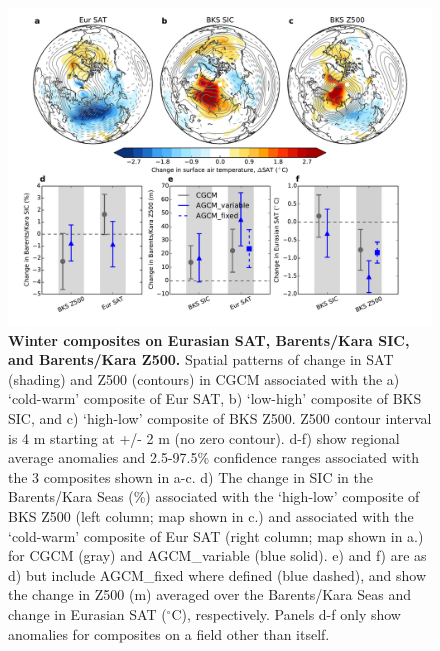 \documentclass{nature}
\begin{document}
\begin{figure}%
\centering
\noindent\includegraphics[width=39pc]{Word/Figure_5.pdf}
\caption{\textbf{Winter composites on Eurasian SAT, Barents/Kara SIC, and Barents/Kara Z500.} Spatial patterns of change in SAT (shading) and Z500 (contours) in CGCM associated with the a) `cold-warm' composite of Eur SAT, b) `low-high' composite of BKS SIC, and c) `high-low' composite of BKS Z500. Z500 contour interval is 4 m starting at +/- 2 m (no zero contour). d-f) show regional average anomalies and 2.5-97.5\% confidence ranges associated with the 3 composites shown in a-c. d) The change in SIC in the Barents/Kara Seas (\%) associated with the `high-low' composite of BKS Z500 (left column; map shown in c.) and associated with the `cold-warm' composite of Eur SAT (right column; map shown in a.) for CGCM (gray) and AGCM\_variable (blue solid). e) and f) are as d) but include AGCM\_fixed where defined (blue dashed), and show the change in Z500 (m) averaged over the Barents/Kara Seas and change in Eurasian SAT ($^\circ$C), respectively. Panels d-f only show anomalies for composites on a field other than itself. 
} %
\label{fig:fig5} 
\end{figure}
\end{document}
